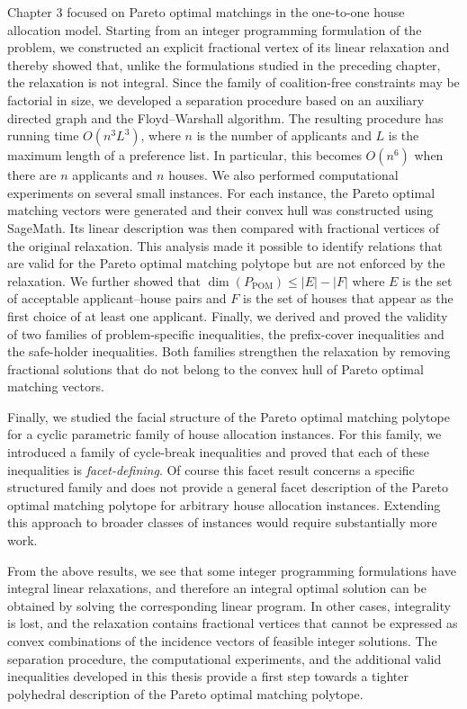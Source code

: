 \documentclass[12pt]{report}
\numberwithin{algorithm}{chapter}
\begin{document}
	Chapter $3$ focused on Pareto optimal matchings in the one-to-one house allocation model. Starting from an integer programming formulation of the problem, we constructed an explicit fractional vertex of its linear relaxation and thereby showed that, unlike the formulations studied in the preceding chapter, the relaxation is not integral. Since the family of coalition-free constraints may be factorial in size, we developed a separation procedure based on an auxiliary directed graph and the Floyd–Warshall algorithm. The resulting procedure has running time $O(n^{3}L^{3})$, where $n$ is the number of applicants and $L$ is the maximum length of a preference list. In particular, this becomes $O(n^{6})$ when there are $n$ applicants and $n$ houses. We also performed computational experiments on several small instances. For each instance, the Pareto optimal matching vectors were generated and their convex hull was constructed using SageMath. Its linear description was then compared with fractional vertices of the original relaxation. This analysis made it possible to identify relations that are valid for the Pareto optimal matching polytope but are not enforced by the relaxation. We further showed that $\dim(P_{\mathrm{POM}})\le |E|-|F|$ where $E$ is the set of acceptable applicant–house pairs and $F$ is the set of houses that appear as the first choice of at least one applicant. Finally, we derived and proved the validity of two families of problem-specific inequalities, the prefix-cover inequalities and the safe-holder inequalities. Both families strengthen the relaxation by removing fractional solutions that do not belong to the convex hull of Pareto optimal matching vectors.
	
	Finally, we studied the facial structure of the Pareto optimal matching polytope for a cyclic parametric family of house allocation instances. For this family, we introduced a family of cycle-break inequalities and proved that each of these inequalities is \emph{facet-defining}. Of course this facet result concerns a specific structured family and does not provide a general facet description of the Pareto optimal matching polytope for arbitrary house allocation instances. Extending this approach to broader classes of instances would require substantially more work.
	
	From the above results, we see that some integer programming formulations have integral linear relaxations, and therefore an integral optimal solution can be obtained by solving the corresponding linear program. In other cases, integrality is lost, and the relaxation contains fractional vertices that cannot be expressed as convex combinations of the incidence vectors of feasible integer solutions. The separation procedure, the computational experiments, and the additional valid inequalities developed in this thesis provide a first step towards a tighter polyhedral description of the Pareto optimal matching polytope.
	
\end{document}

